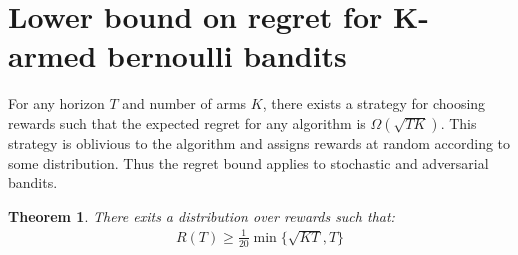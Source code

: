\documentclass{article}
\newcommand{\eqn}[1]{\begin{align}#1\end{align}}
\newcommand{\bigomega}[1]{\Omega\left( #1 \right)}
\theoremstyle{plain}
\newtheorem{theorem}{Theorem}
\theoremstyle{definition}
\begin{document}
\def\ci{\perp\!\!\!\perp}



\section{Lower bound on regret for K-armed bernoulli bandits}

For any horizon $T$ and number of arms $K$, there exists a strategy for choosing rewards such that the expected regret for any algorithm is $\bigomega{\sqrt{TK}}$. This strategy is oblivious to the algorithm and assigns rewards at random according to some distribution. Thus the regret bound applies to stochastic and adversarial bandits.

\begin{theorem}
There exits a distribution over rewards such that: 
\eqn {
R(T) \geq \frac{1}{20}\min{\{\sqrt{KT},T\}}
}
\end{theorem}
\end{document}
